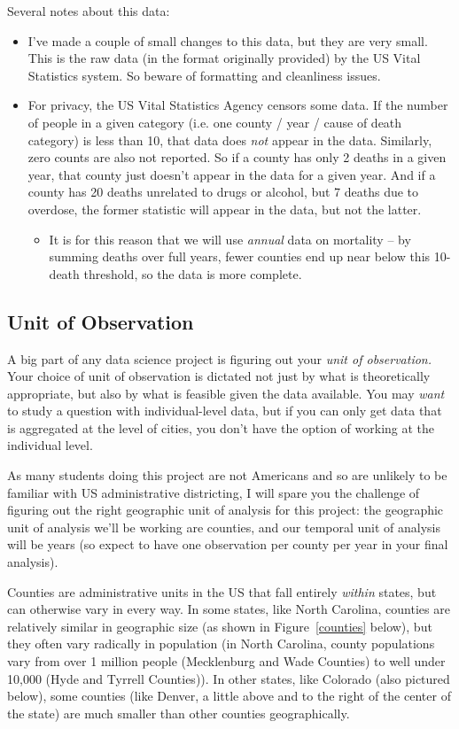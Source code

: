 \documentclass[12pt]{article}
\begin{document}
Several notes about this data:
\begin{itemize}
  \item I've made a couple of small changes to this data, but they are very small. This is the raw data (in the format originally provided) by the US Vital Statistics system. So beware of formatting and cleanliness issues.
  \item For privacy, the US Vital Statistics Agency censors some data. If the number of people in a given category (i.e. one county / year / cause of death category) is less than 10, that data does \emph{not} appear in the data. Similarly, zero counts are also not reported. So if a county has only 2 deaths in a given year, that county just doesn't appear in the data for a given year. And if a county has 20 deaths unrelated to drugs or alcohol, but 7 deaths due to overdose, the former statistic will appear in the data, but not the latter.
  \begin{itemize}
    \item It is for this reason that we will use \emph{annual} data on mortality -- by summing deaths over full years, fewer counties end up near below this 10-death threshold, so the data is more complete.
  \end{itemize}
\end{itemize}


\subsection*{Unit of Observation}

A big part of any data science project is figuring out your \emph{unit of observation.} Your choice of unit of observation is dictated not just by what is theoretically appropriate, but also by what is feasible given the data available. You may \emph{want} to study a question with individual-level data, but if you can only get data that is aggregated at the level of cities, you don't have the option of working at the individual level.

As many students doing this project are not Americans and so are unlikely to be familiar with US administrative districting, I will spare you the challenge of figuring out the right geographic unit of analysis for this project: the geographic unit of analysis we'll be working are counties, and our temporal unit of analysis will be years (so expect to have one observation per county per year in your final analysis).

Counties are administrative units in the US that fall entirely \emph{within} states, but can otherwise vary in every way. In some states, like North Carolina, counties are relatively similar in geographic size (as shown in Figure~\ref{counties} below), but they often vary radically in population (in North Carolina, county populations vary from over 1 million people (Mecklenburg and Wade Counties) to well under 10,000 (Hyde and Tyrrell Counties)). In other states, like Colorado (also pictured below), some counties (like Denver, a little above and to the right of the center of the state) are much smaller than other counties geographically.
\end{document}
